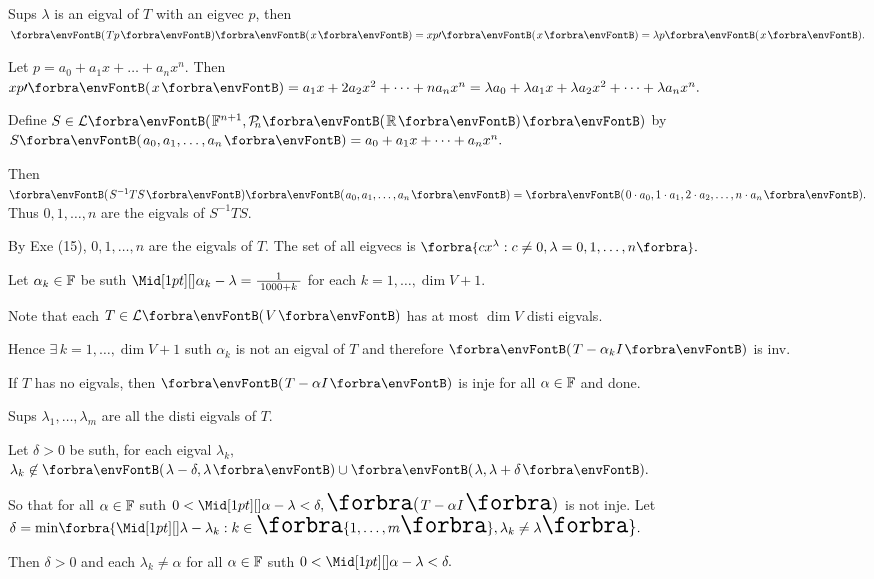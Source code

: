 \par\quad
Sups $\lambda$ is an eigval of $T$ with an eigvec $p$, then $\Par{Tp}\Par{x}=xp\apostrophe\Par{x}=\lambda p\Par{x}.$\par\quad
Let $p=a_0+a_1 x+\dots+a_n x^n.$ Then $xp\apostrophe\Par{x}=a_1 x+2a_2 x^2+\dots+n a_n x^n=\lambda a_0+\lambda a_1 x+\lambda a_2 x^2+\dots+\lambda a_n x^n.$\par\quad
Define $S\in\Lm{\Fbb^{n+1},\PoR{n}}$ by $S\Par{a_0,a_1,\dots,a_n}=a_0+a_1x+\dots+a_nx^n.$\par\quad
Then $\Par{S^{-1}TS}\Par{a_0,a_1,\dots,a_n}=\Par{0\cdot a_0,1\cdot a_1,2\cdot a_2,\dots,n\cdot a_n}.$ Thus $0,1,\dots,n$ are the eigvals of $S^{-1}TS.$\par\quad
By Exe (15), $0,1,\dots,n$ are the eigvals of $T$. The set of all eigvecs is $\Bra{cx^\lambda:c\neq 0,\lambda=0,1,\dots,n}.$\PfEnd
\SepLine

\par\quad
Let $\alpha_k\in{\mathbb{F}}$ be suth $\aMid{\alpha_k-\lambda}=\frac{1}{\;1000+k\;}$ for each $k=1,\dots,\dim V+1.$\par\vspace{2pt}\quad
Note that each $T\in\Lm{V}$ has at most $\dim V$ disti eigvals.\par\quad
Hence $\exists\,k=1,\dots,\dim V+1$ suth $\alpha_k$ is not an eigval of $T$ and therefore $\Par{T-\alpha_k I}$ is inv.\PfEnd
\SepLine[0pt][\Blind{\BulletPointX} ]

\par\quad
If $T$ has no eigvals, then $\Par{T-\alpha I}$ is inje for all $\alpha\in{\mathbb{F}}$ and done.\par\quad
Sups $\lambda_1,\dots,\lambda_m$ are all the disti eigvals of $T.$\par\quad
Let $\delta>0$ be suth, for each eigval $\lambda_k,$ $\lambda_k\not\in\Par{\lambda-\delta,\lambda}\cup \Par{\lambda,\lambda+\delta}.$\par\quad
So that for all $\alpha\in{\mathbb{F}}$ suth $0<\aMid{\alpha-\lambda}<\delta,\Par{T-\alpha I}$ is not inje.\PfEnd\vspace{4pt}\quad
\Or Let $\delta=\min\!\Bra{\aMid{\lambda-\lambda_k}:k\in\envFontSmall\Bra{1,\dots,m}\envFontDefault,\lambda_k\neq\lambda}.$\par\quad
Then $\delta>0$ and each $\lambda_k\neq\alpha$  for all $\alpha\in{\mathbb{F}}$ suth $0<\aMid{\alpha-\lambda}<\delta.$\PfEnd
\SepLine

